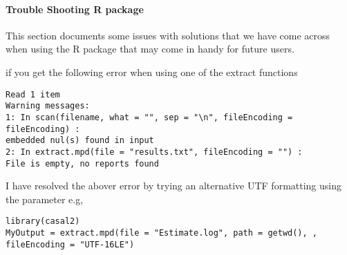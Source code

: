 \paragraph*{Trouble Shooting R package}
This section documents some issues with solutions that we have come across when using the R package that may come in handy for future users.

if you get the following error when using one of the extract functions 
\begin{lstlisting}
Read 1 item
Warning messages:
1: In scan(filename, what = "", sep = "\n", fileEncoding = fileEncoding) :
embedded nul(s) found in input
2: In extract.mpd(file = "results.txt", fileEncoding = "") :
File is empty, no reports found
\end{lstlisting}

I have resolved the abover error by trying an alternative UTF formatting using the  parameter e.g,
\begin{lstlisting}
library(casal2)
MyOutput = extract.mpd(file = "Estimate.log", path = getwd(), , fileEncoding = "UTF-16LE")
\end{lstlisting}